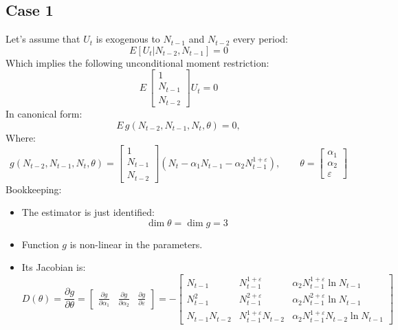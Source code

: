     \subsection{Case 1}
    Let's assume that $U_t$ is exogenous to $N_{t-1}$ and $N_{t-2}$ every period:
    \begin{equation}
        E[U_t|N_{t-2}, N_{t-1}] = 0
    \end{equation}
    Which implies the following unconditional moment restriction:
    \begin{equation}
        E \, \begin{bmatrix} 1  \\ N_{t-1} \\ N_{t-2} \end{bmatrix} U_t = 0
    \end{equation}
    In canonical form:
     \begin{equation}
        E \, g(N_{t-2}, N_{t-1}, N_t, \theta) = 0,
    \end{equation}
    Where:
    \begin{equation}
        g(N_{t-2}, N_{t-1}, N_t, \theta) =  \begin{bmatrix} 1 \\ N_{t-1} \\ N_{t-2}  \end{bmatrix} \left( N_{t} - \alpha_1 N_{t-1} - \alpha_2 N_{t-1}^{1 + \varepsilon} \right), \qquad \theta = \begin{bmatrix}
        \alpha_1 \\ \alpha_2 \\ \varepsilon \end{bmatrix}
    \end{equation}
    Bookkeeping:
    \begin{itemize}
        \item The estimator is just identified:
        \begin{equation}
            \dim \theta = \dim g = 3
        \end{equation}
        \item Function $g$ is non-linear in the parameters.
        \item Its Jacobian is:
        \begin{equation}
            D(\theta)= \frac{\partial g}{\partial \theta} =
            \begin{bmatrix}
                \frac{\partial g}{\partial \alpha_1} & \frac{\partial g}{\partial \alpha_2} & \frac{\partial g}{\partial \varepsilon}
            \end{bmatrix} = -
            \begin{bmatrix}
                N_{t-1} & N_{t-1}^{1+\varepsilon} & \alpha_2 N_{t-1}^{1+\varepsilon} \ln N_{t-1} \\
                N_{t-1}^{2} & N_{t-1}^{2+\varepsilon} & \alpha_2 N_{t-1}^{2+\varepsilon} \ln N_{t-1}\\
                N_{t-1} N_{t-2} & N_{t-1}^{1+\varepsilon} N_{t-2} & \alpha_2 N_{t-1}^{1+\varepsilon} N_{t-2} \ln N_{t-1}
            \end{bmatrix}
        \end{equation}
    \end{itemize}
